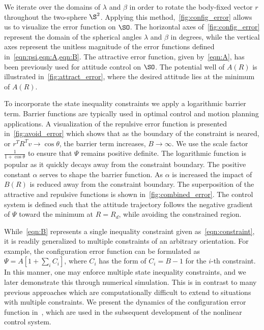 We iterate over the domains of \( \lambda\) and \(\beta\) in order to rotate the body-fixed vector \( r \) throughout the two-sphere \( \S^2 \).
Applying this method,~\cref{fig:config_error} allows us to visualize the error function on \( \SO \).
The horizontal axes of~\cref{fig:config_error} represent the domain of the spherical angles \( \lambda \) and \( \beta \) in degrees, while the vertical axes represent the unitless magnitude of the error functions defined in~\cref{eqn:psi,eqn:A,eqn:B}.
The attractive error function, given by~\cref{eqn:A}, has been previously used for attitude control on \(\SO\).
The potential well of \( A(R)\) is illustrated in~\cref{fig:attract_error}, where the desired attitude lies at the minimum of \( A(R) \).

To incorporate the state inequality constraints we apply a logarithmic barrier term.
Barrier functions are typically used in optimal control and motion planning applications.
A visualization of the repulsive error function is presented in~\cref{fig:avoid_error} which shows that as the boundary of the constraint is neared, or \( r^T R^T v \to \cos \theta \), the barrier term increases, \( B \to \infty\).
We use the scale factor~\(\frac{1}{1+\cos \theta} \) to ensure that \( \Psi \) remains positive definite.
The logarithmic function is popular as it quickly decays away from the constraint boundary.
The positive constant \( \alpha \) serves to shape the barrier function.
As \( \alpha \) is increased the impact of \( B(R) \) is reduced away from the constraint boundary. 
The superposition of the attractive and repulsive functions is shown in~\cref{fig:combined_error}.
The control system is defined such that the attitude trajectory follows the negative gradient of \( \Psi \) toward the minimum at \( R = R_d \), while avoiding the constrained region.

While~\cref{eqn:B} represents a single inequality constraint given as~\cref{eqn:constraint}, it is readily generalized to multiple constraints of an arbitrary orientation. 
For example, the configuration error function can be formulated as $\Psi=A[1+\sum_i C_i]$, where $C_i$ has the form of $C_i=B-1$ for the $i$-th constraint. 
In this manner, one may enforce multiple state inequality constraints, and we later demonstrate this through numerical simulation. 
This is in contrast to many previous approaches which are computationally difficult to extend to situations with multiple constraints.
We present the dynamics of the configuration error function in~, which are used in the subsequent development of the nonlinear control system.

